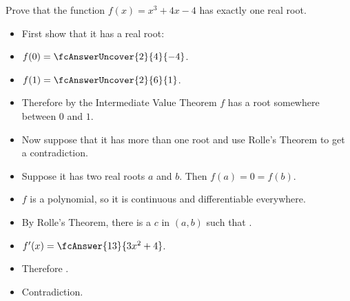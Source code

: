 \begin{frame}
\begin{example}
Prove that the function $f(x) = x^3 + 4x - 4$ has exactly one real root.
\begin{itemize}
\item<2->  First show that it has a real root:
\item<2-| alert@3-4>  $f(0) =\fcAnswerUncover{2}{4}{-4}$.
\item<2-| alert@5-6>  $f(1) =\fcAnswerUncover{2}{6}{1}$.
\item<7->  Therefore by the Intermediate Value Theorem $f$ has a root somewhere between $0$ and $1$.
\item<8->  Now suppose that it has more than one root and use Rolle's Theorem to get a contradiction.
\item<9->  Suppose it has two real roots $a$ and $b$.  Then $f(a) = 0 = f(b)$.
\item<10->  $f$ is a polynomial, so it is continuous and differentiable everywhere.
\item<11->  By Rolle's Theorem, there is a $c$ in $(a,b)$ such that .
\item<12-| alert@12-13>  $f'(x) = \fcAnswer{13}{3x^2 + 4}$.
\item<14->  Therefore .
\item<15-| alert@15>  Contradiction.
\end{itemize}
\end{example}
\end{frame}
